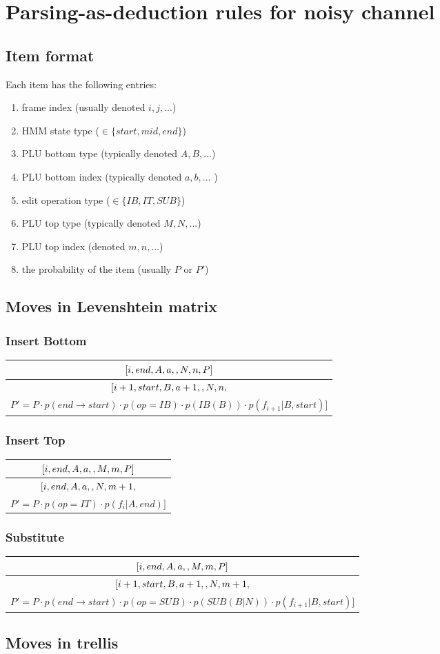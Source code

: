 \documentclass[12pt,letterpaper]{article}
\newcommand{\myrule}[2]{\begin{tabular}{c}
#1 \\
\hline
#2
\end{tabular}}
\newcommand{\toprulecomp}[8]{
    $[#1, #2, #3, #4, #5, #6, #7, #8 ]$
}
\newcommand{\botrulecomp}[8]{
    $[#1, #2, #3, #4, #5, #6, #7,$\\
    $ #8 ]$
}
\begin{document}
\section{Parsing-as-deduction rules for noisy channel}
\subsection{Item format}
Each item has the following entries: 
\begin{enumerate}
\item frame index (usually denoted $i, j, ...$)
\item HMM state type ($\in \{start, mid, end\}$)
\item PLU bottom type (typically denoted $A, B, ...$)
\item PLU bottom index (typically denoted $a, b, ...$ )
\item edit operation type ($\in \{IB, IT, SUB\}$)
\item PLU top type (typically denoted $M, N, ...$)
\item PLU top index (denoted $m, n, ...$)
\item the probability of the item (usually $P$ or $P'$)
\end{enumerate}
\subsection{Moves in Levenshtein matrix}
\subsubsection{Insert Bottom}
\myrule{
    \toprulecomp{i}{end}{A}{a}{\*}{N}{n}{P}
    }
    {
    \botrulecomp{i+1}{start}{B}{a+1}{\*}{N}{n}{P' = P \cdot p(end \rightarrow start) \cdot p(op = IB) \cdot p(IB(B)) \cdot p(f_{i+1} | B, start)}
}

\subsubsection{Insert Top}
\myrule{
    \toprulecomp{i}{end}{A}{a}{\*}{M}{m}{P}
    }
    {
    \botrulecomp{i}{end}{A}{a}{\*}{N}{m+1}{P' = P \cdot p(op = IT) \cdot p(f_{i} | A, end)}
}

\subsubsection{Substitute}
\myrule{
    \toprulecomp{i}{end}{A}{a}{\*}{M}{m}{P}
    }
    {
    \botrulecomp{i+1}{start}{B}{a+1}{\*}{N}{m+1}{P' = P \cdot p(end \rightarrow start) \cdot p(op = SUB) \cdot p(SUB(B | N)) \cdot p(f_{i+1} | B, start)}
}

\subsection{Moves in trellis}
\end{document}
